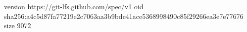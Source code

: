 version https://git-lfs.github.com/spec/v1
oid sha256:a4c5d87fa77219e2c7063aa3b9bde41ace5368998490c85f29266ea3e7e77676
size 9072
